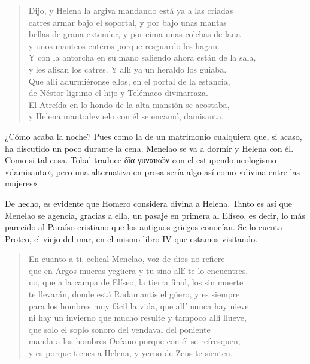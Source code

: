 \documentclass[11pt,a4paper]{article}
\newcommand{\gr}[1]{\foreignlanguage{greek}{#1}}
\begin{document}
\begin{verse}
Dijo, y Helena la argiva mandando está ya a las criadas\\
catres armar bajo el soportal, y por bajo unas mantas\\
bellas de grana extender, y por cima unas colchas de lana\\
y unos manteos enteros porque resguardo les hagan.\\
Y con la antorcha en su mano saliendo ahora están de la sala,\\
y les alisan los catres. Y allí ya un heraldo los guiaba.\\
Que allí adurmiéronse ellos, en el portal de la estancia,\\
de Néstor lígrimo el hijo y Telémaco divinarraza.\\
El Atreída en lo hondo de la alta mansión se acostaba,\\
y Helena mantodevuelo con él se encamó, damisanta.
\end{verse}

¿Cómo acaba la noche? Pues como la de un matrimonio cualquiera que, si acaso, ha discutido un poco durante la cena. Menelao se va a dormir y Helena con él. Como si tal cosa. Tobal traduce \gr{δῖα γυναικῶν} con el estupendo neologismo «damisanta», pero una alternativa en prosa sería algo así como «divina entre las mujeres».

De hecho, es evidente que Homero considera divina a Helena. Tanto es así que Menelao se agencia, gracias a ella, un pasaje en primera al Elíseo, es decir, lo más parecido al Paraíso cristiano que los antiguos griegos conocían. Se lo cuenta Proteo, el viejo del mar, en el mismo libro IV que estamos visitando.


\begin{verse}
En cuanto a ti, celical Menelao, voz de dios no refiere\\
que en Argos mueras yegüera y tu sino allí te lo encuentres,\\
no, que a la campa de Elíseo, la tierra final, los sin muerte\\
te llevarán, donde está Radamantis el güero, y es siempre\\
para los hombres muy fácil la vida, que allí nunca hay nieve\\
ni hay un invierno que mucho resulte y tampoco allí llueve,\\
que solo el soplo sonoro del vendaval del poniente\\
manda a los hombres Océano porque con él se refresquen;\\
y es porque tienes a Helena, y yerno de Zeus te sienten.
\end{verse}
\end{document}
